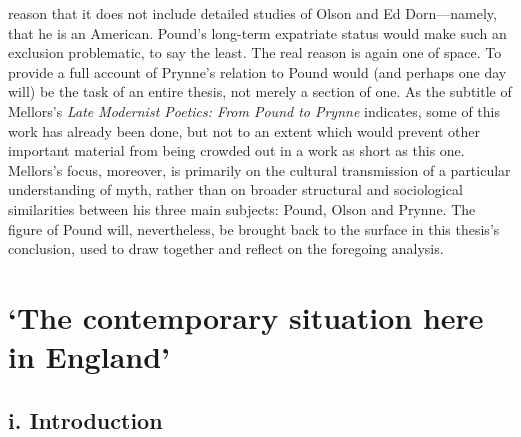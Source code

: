 \documentclass[]{article}
\begin{document}
reason that it does not include detailed studies of Olson and Ed
Dorn---namely, that he is an American. Pound's long-term expatriate
status would make such an exclusion problematic, to say the least. The
real reason is again one of space. To provide a full account of Prynne's
relation to Pound would (and perhaps one day will) be the task of an
entire thesis, not merely a section of one. As the subtitle of Mellors's
\emph{Late Modernist Poetics: From Pound to Prynne} indicates, some of
this work has already been done, but not to an extent which would
prevent other important material from being crowded out in a work as
short as this one. Mellors's focus, moreover, is primarily on the
cultural transmission of a particular understanding of myth, rather than
on broader structural and sociological similarities between his three
main subjects: Pound, Olson and Prynne. The figure of Pound will,
nevertheless, be brought back to the surface in this thesis's
conclusion, used to draw together and reflect on the foregoing analysis.
\newpage

\section{\texorpdfstring{`The contemporary situation here in
England'}{The contemporary situation here in England}}\label{the-contemporary-situation-here-in-england}

\subsection{i. Introduction}\label{i.-introduction}
\end{document}
